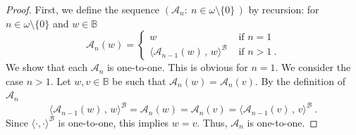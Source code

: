 \documentclass[10pt,a4paper, openany,  oldfontcommands]{memoir}
\newtheorem{open problem} [theorem] {Open Problem}
\newtheorem{open question} [theorem] {Open Question}
\begin{document}
\begin{proof}

First, we define the sequence    $  \left(  \mathcal{A}_n :    \   n  \in  \omega  \setminus  \lbrace 0  \rbrace  \,  \right)    $
by recursion:  for  $  n  \in  \omega  \setminus  \lbrace  0  \rbrace  $  and  $  w  \in  \mathbb{B}  $
\[
\mathcal{A}_n  \left(  w  \right)    =  \begin{cases}
w     &     \mbox{  if  }   n  =  1  
\\
\langle   \mathcal{A}_{n-1}  \left(  w  \right)   \,   ,  \,  w   \rangle^{   \mathcal{B} }       &   \mbox{  if   }  n  >  1  
\       .
\end{cases}
\]
We show that each   $  \mathcal{A}_n   $  is one-to-one. 
This is obvious for    $  n = 1  $. 
We consider the case  $  n >  1  $. 
Let  $  w,  v  \in  \mathbb{B}  $  be such that  $  \mathcal{A}_{n}  \left(  w  \right)    =  \mathcal{A}_{n}  \left(  v  \right)    $.
By the definition of    $  \mathcal{A}_{n}   $  
\[
\langle    \mathcal{A}_{n-1}  \left(  w  \right)   \,   ,  \,  w   \rangle^{   \mathcal{B} } 
  =   \mathcal{A}_{n}  \left(  w  \right)    
 =  \mathcal{A}_{n}  \left(  v  \right) 
 = 
 \langle    \mathcal{A}_{n-1}  \left(  v  \right)   \,   ,  \,  v   \rangle^{   \mathcal{B} } 
\    .
\]
Since  $  \langle  \cdot  ,  \cdot  \rangle^{  \mathcal{B} }  $  is one-to-one,  this implies    $  w  =  v  $. 
Thus,    $  \mathcal{A}_n   $  is one-to-one. 





\end{proof}
\end{document}
